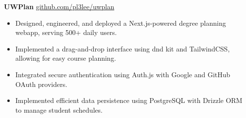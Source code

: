 \textbf{UWPlan} \hfill \href{https://github.com/pl3lee/uwplan}{github.com/pl3lee/uwplan} \\
\vspace{-9pt}
\begin{itemize}
  \item Designed, engineered, and deployed a Next.js-powered degree planning webapp, serving 500+ daily users.
  \item Implemented a drag-and-drop interface using dnd kit and TailwindCSS, allowing for easy course planning.
  \item Integrated secure authentication using Auth.js with Google and GitHub OAuth providers.
  \item Implemented efficient data persistence using PostgreSQL with Drizzle ORM to manage student schedules.
\end{itemize}